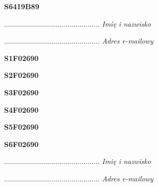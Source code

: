 \begin{turn}{90}\huge \textbf{S6419B89}\end{turn}

\begin{turn}{90}\begin{minipage}{\linewidth} \vspace{20mm} ................................................  \textit{Imię i nazwisko}\end{minipage}\end{turn}

\begin{turn}{90}\begin{minipage}{\linewidth} \vspace{20mm} ................................................  \textit{Adres e-mailowy}\end{minipage}\end{turn}

\begin{turn}{90}\huge \textbf{S1F02690}\end{turn}

\begin{turn}{90}\huge \textbf{S2F02690}\end{turn}

\begin{turn}{90}\huge \textbf{S3F02690}\end{turn}

\begin{turn}{90}\huge \textbf{S4F02690}\end{turn}

\begin{turn}{90}\huge \textbf{S5F02690}\end{turn}

\begin{turn}{90}\huge \textbf{S6F02690}\end{turn}

\begin{turn}{90}\begin{minipage}{\linewidth} \vspace{20mm} ................................................  \textit{Imię i nazwisko}\end{minipage}\end{turn}

\begin{turn}{90}\begin{minipage}{\linewidth} \vspace{20mm} ................................................  \textit{Adres e-mailowy}\end{minipage}\end{turn}

